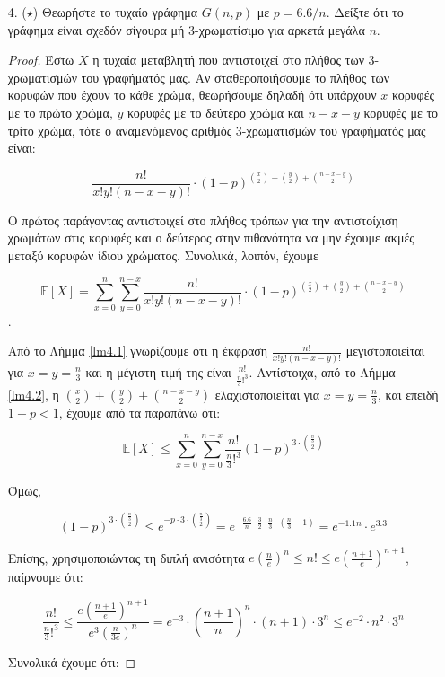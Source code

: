 \documentclass[a4paper, oneside, 11pt]{article}
\theoremstyle{definition}
\newcommand{\ex}{\mathbb{E}}
\begin{document}
\begin{enumerate}
\begin{proof}
   \end{proof}

\item[4. ($\star$)]
   Θεωρήστε το τυχαίο γράφημα $G(n, p)$ με $p = 6.6/n$. Δείξτε ότι το γράφημα
   είναι σχεδόν σίγουρα μή 3-χρωματίσιμο για αρκετά μεγάλα $n$.

   \begin{proof}
Έστω $X$ η τυχαία μεταβλητή που αντιστοιχεί στο πλήθος των 3-χρωματισμών του γραφήματός μας. Αν σταθεροποιήσουμε το πλήθος των κορυφών που έχουν το κάθε χρώμα, θεωρήσουμε δηλαδή ότι υπάρχουν $x$ κορυφές
με το πρώτο χρώμα, $y$ κορυφές με το δεύτερο χρώμα και $n-x-y$ κορυφές με το τρίτο χρώμα, τότε ο αναμενόμενος αριθμός 3-χρωματισμών του γραφήματός μας είναι:

\[ \frac{n!}{x!y!(n-x-y)!} \cdot 
(1-p)^{{x \choose 2} + {y\choose 2} + {n-x-y\choose 2}}\]

Ο πρώτος παράγοντας αντιστοιχεί στο πλήθος τρόπων για την αντιστοίχιση χρωμάτων στις κορυφές και ο δεύτερος στην πιθανότητα να μην έχουμε ακμές
μεταξύ κορυφών ίδιου χρώματος. Συνολικά, λοιπόν, έχουμε

\[ \ex[X] = \sum_{x=0}^{n} \sum_{y=0}^{n-x} \frac{n!}{x!y!(n-x-y)!}\cdot (1-p)^{{x\choose 2}+{y\choose 2}+{n-x-y\choose 2}}\].

Από το Λήμμα \ref{lm4.1} γνωρίζουμε ότι η έκφραση $\frac{n!}{x!y!(n-x-y)!}$ μεγιστοποιείται για $x=y=\frac{n}{3}$ και η μέγιστη τιμή της είναι $\frac{n!}{\frac{n}{3}!^3}$. Αντίστοιχα, 
από το Λήμμα \ref{lm4.2},
η ${{x \choose 2} + {y\choose 2} + {n-x-y\choose 2}}$ 
ελαχιστοποιείται για $x=y=\frac{n}{3}$, και επειδή $1-p<1$, έχουμε από τα παραπάνω ότι:

\[ \ex[X] \leq \sum_{x=0}^{n}\sum_{y=0}^{n-x} \frac{n!}{\frac{n}{3}!^3} (1-p)^{3\cdot {\frac{n}{3}\choose 2}} \]

Όμως,

\[ (1-p)^{3\cdot {\frac{n}{3}\choose 2}}\leq e^{-p\cdot {3\cdot {\frac{n}{3}\choose 2}}}=e^{-\frac{6.6}{n}\cdot {\frac{3}{2}\cdot \frac{n}{3}\cdot (\frac{n}{3}-1)}}=e^{-1.1n}\cdot e^{3.3} \]

Επίσης, χρησιμοποιώντας τη διπλή ανισότητα $e(\frac{n}{e})^n \leq n! \leq e(\frac{n+1}{e})^{n+1}$, παίρνουμε ότι:

\[ \frac{n!}{\frac{n}{3}!^3}\leq \frac{e(\frac{n+1}{e})^{n+1}}{e^3 (\frac{n}{3e})^n
}=e^{-3} \cdot (\frac{n+1}{n})^n \cdot (n+1) \cdot 3^{n} \leq e^{-2} \cdot n^2 \cdot 3^{n} \]

Συνολικά έχουμε ότι:


\end{proof}
\end{enumerate}
\end{document}
